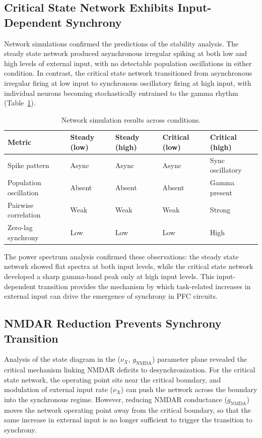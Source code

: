 \documentclass[11pt]{article}
\begin{document}
\subsection{Critical State Network Exhibits Input-Dependent Synchrony}

Network simulations confirmed the predictions of the stability analysis. The steady state network produced asynchronous irregular spiking at both low and high levels of external input, with no detectable population oscillations in either condition. In contrast, the critical state network transitioned from asynchronous irregular firing at low input to synchronous oscillatory firing at high input, with individual neurons becoming stochastically entrained to the gamma rhythm (Table~\ref{tab:simresults}).

\begin{table}[htbp]
\centering
\caption{Network simulation results across conditions.}
\label{tab:simresults}
\begin{tabular}{lllll}
\toprule
Metric & Steady (low) & Steady (high) & Critical (low) & Critical (high) \\
\midrule
Spike pattern & Async & Async & Async & Sync oscillatory \\
Population oscillation & Absent & Absent & Absent & Gamma present \\
Pairwise correlation & Weak & Weak & Weak & Strong \\
Zero-lag synchrony & Low & Low & Low & High \\
\bottomrule
\end{tabular}
\end{table}

The power spectrum analysis confirmed these observations: the steady state network showed flat spectra at both input levels, while the critical state network developed a sharp gamma-band peak only at high input levels. This input-dependent transition provides the mechanism by which task-related increases in external input can drive the emergence of synchrony in PFC circuits.

\subsection{NMDAR Reduction Prevents Synchrony Transition}

Analysis of the state diagram in the ($\nu_X$, $g_\text{NMDA}$) parameter plane revealed the critical mechanism linking NMDAR deficits to desynchronization. For the critical state network, the operating point sits near the critical boundary, and modulation of external input rate ($\nu_X$) can push the network across the boundary into the synchronous regime. However, reducing NMDAR conductance ($g_\text{NMDA}$) moves the network operating point away from the critical boundary, so that the same increase in external input is no longer sufficient to trigger the transition to synchrony.
\end{document}

